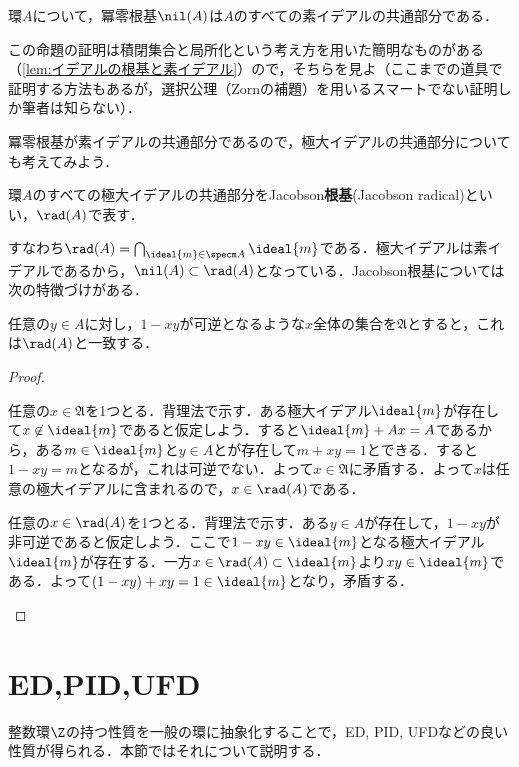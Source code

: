 \begin{cor}
	環$A$について，冪零根基$\nil (A)$は$A$のすべての素イデアルの共通部分である．
\end{cor}

この命題の証明は積閉集合と局所化という考え方を用いた簡明なものがある（\ref{lem:イデアルの根基と素イデアル}）ので，そちらを見よ（ここまでの道具で証明する方法もあるが，選択公理（Zornの補題）を用いるスマートでない証明しか筆者は知らない）．

冪零根基が素イデアルの共通部分であるので，極大イデアルの共通部分についても考えてみよう．
\begin{defi}[Jacobson根基]
	環$A$のすべての極大イデアルの共通部分をJacobson\textbf{根基}(Jacobson radical)といい，$\rad(A)$で表す．
\end{defi}

すなわち$\rad(A)=\bigcap_{\ideal{m}\in\specm A}\ideal{m}$である．極大イデアルは素イデアルであるから，$\nil(A)\subset\rad(A)$となっている．Jacobson根基については次の特徴づけがある．
\begin{prop}
	任意の$y\in A$に対し，$1-xy$が可逆となるような$x$全体の集合を$\mathfrak{A}$とすると，これは$\rad(A)$と一致する．
\end{prop}
\begin{proof}
	\begin{mrkw}
		\item 
		任意の$x\in\mathfrak{A}$を1つとる．背理法で示す．ある極大イデアル$\ideal{m}$が存在して$x\not\in\ideal{m}$であると仮定しよう．すると$\ideal{m}+Ax=A$であるから，ある$m\in\ideal{m}$と$y\in A$とが存在して$m+xy=1$とできる．すると$1-xy=m$となるが，これは可逆でない．よって$x\in\mathfrak{A}$に矛盾する．よって$x$は任意の極大イデアルに含まれるので，$x\in\rad(A)$である．
		\item 
		任意の$x\in\rad(A)$を1つとる．背理法で示す．ある$y\in A$が存在して，$1-xy$が非可逆であると仮定しよう．ここで$1-xy\in\ideal{m}$となる極大イデアル$\ideal{m}$が存在する．一方$x\in\rad(A)\subset\ideal{m}$より$xy\in\ideal{m}$である．よって$(1-xy)+xy=1\in\ideal{m}$となり，矛盾する．
	\end{mrkw}
\end{proof}

\section{ED,PID,UFD}
整数環$\Z$の持つ性質を一般の環に抽象化することで，ED, PID, UFDなどの良い性質が得られる．本節ではそれについて説明する．

